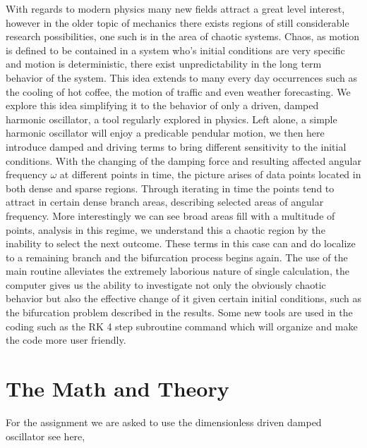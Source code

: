 \documentclass[12pt,letterpaper,notitlepage]{article}
\begin{document}
With regards to modern physics many new fields attract a great level interest, however in the older topic of mechanics there exists regions of still considerable research possibilities, one such is in the area of chaotic systems. Chaos, as motion is defined to be contained in a system who's initial conditions are very specific and motion is deterministic, there exist unpredictability in the long term behavior of the system. This idea extends to many every day occurrences such as the cooling of hot coffee, the motion of traffic and even weather forecasting. We explore this idea simplifying it to the behavior of only a driven, damped harmonic oscillator, a tool regularly explored in physics. Left alone, a simple harmonic oscillator will enjoy a predicable pendular motion, we then here introduce damped and driving terms to bring different sensitivity to the initial conditions. With the changing of the damping force and resulting affected angular frequency $\omega$ at different points in time, the picture arises of data points  located in both dense and sparse regions. Through iterating in time the points tend to attract in certain dense branch areas, describing selected areas of angular frequency. More interestingly we can see broad areas fill with a multitude of points, analysis in this regime, we understand this a chaotic region by the inability to select the next outcome. These terms in this case can and do localize to a remaining branch and the bifurcation process begins again.  The use of the main routine alleviates the extremely laborious nature of single calculation, the computer gives us the ability to investigate not only the obviously chaotic behavior but also the effective change of it given certain initial conditions, such as the bifurcation problem described in the results. Some new tools are used in the coding such as the RK 4 step subroutine command which will organize and make the code more user friendly.           


\section{The Math and Theory}

For the assignment we are asked to use the dimensionless driven damped oscillator see here,
\end{document}
